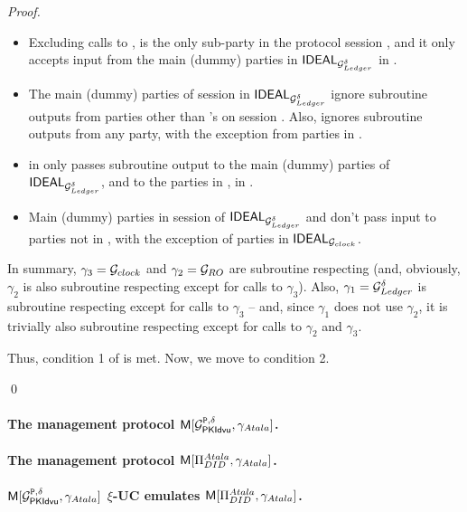 \begin{proof}
  \begin{itemize}
  \item Excluding calls to \IdealGclock, \IdealGdledger is the only sub-party in
    the protocol session \sid, and it only accepts input from the main (dummy)
    parties in $\mathsf{IDEAL}_{\mathcal{G}_{Ledger}^\delta}$ in \sid.
  \item The main (dummy) parties of session \sid in $\mathsf{IDEAL}_{\mathcal{G}_{Ledger}^\delta}$
    ignore subroutine outputs from parties other than \IdealGdledger's on
    session \sid. Also, \IdealGdledger ignores subroutine outputs from any
    party, with the exception from parties in \IdealGclock.
  \item \IdealGdledger in \sid only passes subroutine output to the main (dummy)
    parties of $\mathsf{IDEAL}_{\mathcal{G}_{Ledger}^\delta}$, and to the parties in \IdealGclock,
    in \sid.
  \item Main (dummy) parties in session \sid of $\mathsf{IDEAL}_{\mathcal{G}_{Ledger}^\delta}$ and
    \IdealGdledger don't pass input to parties not in \sid, with the exception
    of parties in $\mathsf{IDEAL}_{\mathcal{G}_{clock}}$.
  \end{itemize}

  In summary, $\gamma_3 = \mathcal{G}_{clock}$ and $\gamma_2 = \mathcal{G}_{RO}$ are
  subroutine respecting (and, obviously, $\gamma_2$ is also subroutine
  respecting except for calls to $\gamma_3$). Also, $\gamma_1 = \mathcal{G}_{Ledger}^\delta$
  is subroutine respecting except for calls to $\gamma_3$ -- and, since
  $\gamma_1$ does not use $\gamma_2$, it is trivially also subroutine respecting
  except for calls to $\gamma_2$ and $\gamma_3$.

  Thus, condition 1 of  is met. Now, we move to condition 2.
  
  \qed
\end{proof}

\paragraph{The management protocol $\mathsf{M}[\mathcal{G}^{\mathtt{P},\delta}_{\mathsf{PKIdvu}},\gamma_{Atala}]$.}

\paragraph{The management protocol $\mathsf{M}[\Pi_{DID}^{Atala},\gamma_{Atala}]$.}

\paragraph{$\mathsf{M}[\mathcal{G}^{\mathtt{P},\delta}_{\mathsf{PKIdvu}},\gamma_{Atala}]$ $\xi$-UC emulates
  $\mathsf{M}[\Pi_{DID}^{Atala},\gamma_{Atala}]$.}


